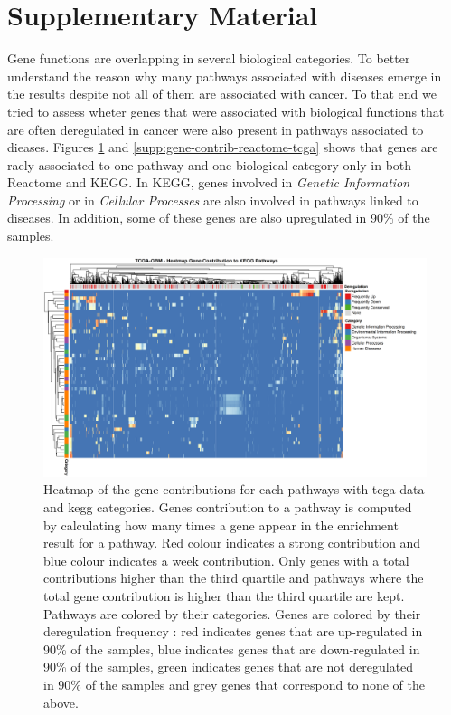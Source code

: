 \section{Supplementary Material}

Gene functions are overlapping in several biological categories.
To better understand the reason why many pathways associated with diseases emerge in the results despite not all of them are associated with cancer.
To that end we tried to assess wheter genes that were associated with biological functions that are often deregulated in cancer were also present in pathways associated to dieases.
Figures \ref*{supp:gene-contrib-kegg-tcga} and \ref*{supp:gene-contrib-reactome-tcga} shows that genes are raely associated to one pathway and one biological category only in both Reactome and KEGG.
In KEGG, genes involved in \textit{Genetic Information Processing} or in \textit{Cellular Processes} are also involved in pathways linked to diseases.
In addition, some of these genes are also upregulated in 90\% of the samples.
\begin{figure}[h]
    \centering
    \includegraphics[width=\textwidth]{img/gene_contrib_kegg_tcga}
    \caption {
        Heatmap of the gene contributions for each pathways with \acrshort{tcga} data and \acrshort{kegg} categories.
        Genes contribution to a pathway is computed by calculating how many times a gene appear in the enrichment result for a pathway.
        Red colour indicates a strong contribution and blue colour indicates a week contribution.
        Only genes with a total contributions higher than the third quartile and pathways where the total gene contribution is higher than the third quartile are kept.
        Pathways are colored by their categories.
        Genes are colored by their deregulation frequency : red indicates genes that are up-regulated in 90\% of the samples, blue indicates genes that are down-regulated in 90\% of the samples, green indicates genes that are not deregulated in 90\% of the samples and grey genes that correspond to none of the above.
    }
    \label{supp:gene-contrib-kegg-tcga}

\end{figure}
